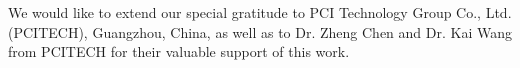 \documentclass[sigconf]{acmart}
\begin{document}
We would like to extend our special gratitude to PCI Technology Group Co., Ltd. (PCITECH), Guangzhou, China, as well as to Dr. Zheng Chen and Dr. Kai Wang from PCITECH for their valuable support of this work.

\clearpage


\balance



\end{document}
